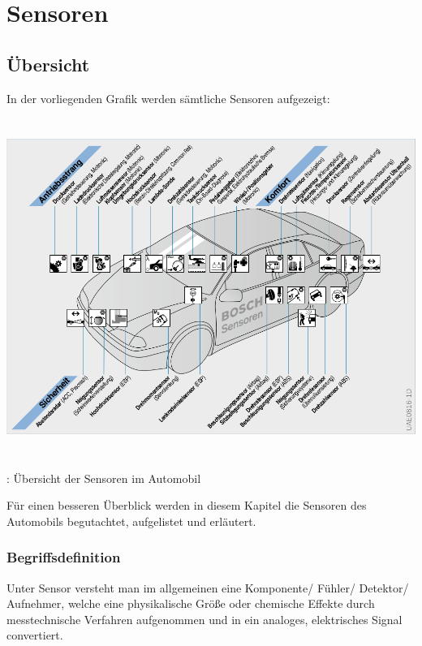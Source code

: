 \documentclass{article}
\begin{document}
	\section{Sensoren}
	
		\subsection{Übersicht} 
		
		In der vorliegenden Grafik werden sämtliche Sensoren aufgezeigt:
			\begin{center}
				\includegraphics[width=15cm, height=11cm] {Images/Kapitel5/sensor_uebersicht.png}
				\caption{\cite{TS01}: Übersicht der Sensoren im Automobil}
	
			\end{center}
			
			\begin{flushleft}	
			
			Für einen besseren Überblick werden in diesem Kapitel die Sensoren des Automobils begutachtet, aufgelistet und erläutert.	
			
			\end{flushleft}	
			
				\subsubsection{Begriffsdefinition}
					
					Unter Sensor versteht man im allgemeinen eine Komponente/ Fühler/ Detektor/ Aufnehmer, welche eine physikalische Größe oder chemische Effekte durch messtechnische Verfahren aufgenommen und in ein analoges, elektrisches Signal convertiert.
\end{document}

